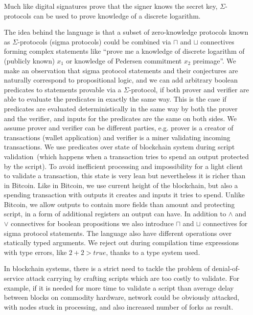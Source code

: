 \documentclass[11pt]{article}
\begin{document}
Much like digital signatures prove that the signer knows the secret key, $\Sigma$-protocols can be used to prove knowledge of a discrete logarithm. 


The idea behind the language is that a subset of zero-knowledge protocols known as $\Sigma$-protocols (sigma protocols) could be combined via $\sqcap$ and $\sqcup$ connectives forming complex statements like ``prove me a knowledge of discrete logarithm of (publicly known) $x_1$ or knowledge of Pedersen commitment $x_2$ preimage''. We make an observation that sigma protocol statements and their conjectures are naturally correspond to propositional logic, and we can add arbitrary boolean predicates to statements provable via a $\Sigma$-protocol, if both prover and verifier are able to evaluate the predicates in exactly the same way. This is the case if predicates are evaluated deterministically in the same way by both the prover and the verifier, and inputs for the predicates are the same on both sides.
We assume prover and verifier can be different parties, e.g. prover is a creator of transactions (wallet application) and verifier is a miner validating incoming transactions.
We use predicates over state of blockchain system during script validation~(which happens when a transaction tries to spend an output protected by the script). To avoid inefficient processing and impossibility for a light client to validate a transaction, this state is very lean but nevertheless it is richer than in Bitcoin. Like in Bitcoin, we use current height of the blockchain, but also a spending transaction with outputs it creates and inputs it tries to spend. Unlike Bitcoin, we allow outputs to contain more fields than amount and protecting script, in a form of additional registers an output can have. In addition to $\land$ and $\lor$ connectives for boolean propositions we also introduce $\sqcap$ and $\sqcup$ connectives for sigma protocol statements. The language also have different operations over statically typed arguments. We reject out during compilation time expressions with type errors, like $2 + 2 > true$, thanks to a type system used.

In blockchain systems, there is a strict need to tackle the problem of denial-of-service attack carrying by crafting scripts which are too costly to validate. For example, if it is needed for more time to validate a script than average delay between blocks on commodity hardware, network could be obviously attacked, with nodes stuck in processing, and also increased number of forks as result. 
\end{document}
